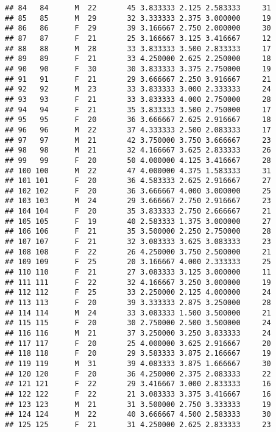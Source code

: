 \documentclass[
]{article}
\begin{document}
\begin{verbatim}
## 84   84      M  22       45 3.833333 2.125 2.583333     31
## 85   85      M  29       32 3.333333 2.375 3.000000     19
## 86   86      F  29       39 3.166667 2.750 2.000000     30
## 87   87      F  21       25 3.166667 3.125 3.416667     12
## 88   88      M  28       33 3.833333 3.500 2.833333     17
## 89   89      F  21       33 4.250000 2.625 2.250000     18
## 90   90      F  30       30 3.833333 3.375 2.750000     19
## 91   91      F  21       29 3.666667 2.250 3.916667     21
## 92   92      M  23       33 3.833333 3.000 2.333333     24
## 93   93      F  21       33 3.833333 4.000 2.750000     28
## 94   94      F  21       35 3.833333 3.500 2.750000     17
## 95   95      F  20       36 3.666667 2.625 2.916667     18
## 96   96      M  22       37 4.333333 2.500 2.083333     17
## 97   97      M  21       42 3.750000 3.750 3.666667     23
## 98   98      M  21       32 4.166667 3.625 2.833333     26
## 99   99      F  20       50 4.000000 4.125 3.416667     28
## 100 100      M  22       47 4.000000 4.375 1.583333     31
## 101 101      F  20       36 4.583333 2.625 2.916667     27
## 102 102      F  20       36 3.666667 4.000 3.000000     25
## 103 103      M  24       29 3.666667 2.750 2.916667     23
## 104 104      F  20       35 3.833333 2.750 2.666667     21
## 105 105      F  19       40 2.583333 1.375 3.000000     27
## 106 106      F  21       35 3.500000 2.250 2.750000     28
## 107 107      F  21       32 3.083333 3.625 3.083333     23
## 108 108      F  22       26 4.250000 3.750 2.500000     21
## 109 109      F  25       20 3.166667 4.000 2.333333     25
## 110 110      F  21       27 3.083333 3.125 3.000000     11
## 111 111      F  22       32 4.166667 3.250 3.000000     19
## 112 112      F  25       33 2.250000 2.125 4.000000     24
## 113 113      F  20       39 3.333333 2.875 3.250000     28
## 114 114      M  24       33 3.083333 1.500 3.500000     21
## 115 115      F  20       30 2.750000 2.500 3.500000     24
## 116 116      M  21       37 3.250000 3.250 3.833333     24
## 117 117      F  20       25 4.000000 3.625 2.916667     20
## 118 118      F  20       29 3.583333 3.875 2.166667     19
## 119 119      M  31       39 4.083333 3.875 1.666667     30
## 120 120      F  20       36 4.250000 2.375 2.083333     22
## 121 121      F  22       29 3.416667 3.000 2.833333     16
## 122 122      F  22       21 3.083333 3.375 3.416667     16
## 123 123      M  21       31 3.500000 2.750 3.333333     19
## 124 124      M  22       40 3.666667 4.500 2.583333     30
## 125 125      F  21       31 4.250000 2.625 2.833333     23

\end{verbatim}
\end{document}
